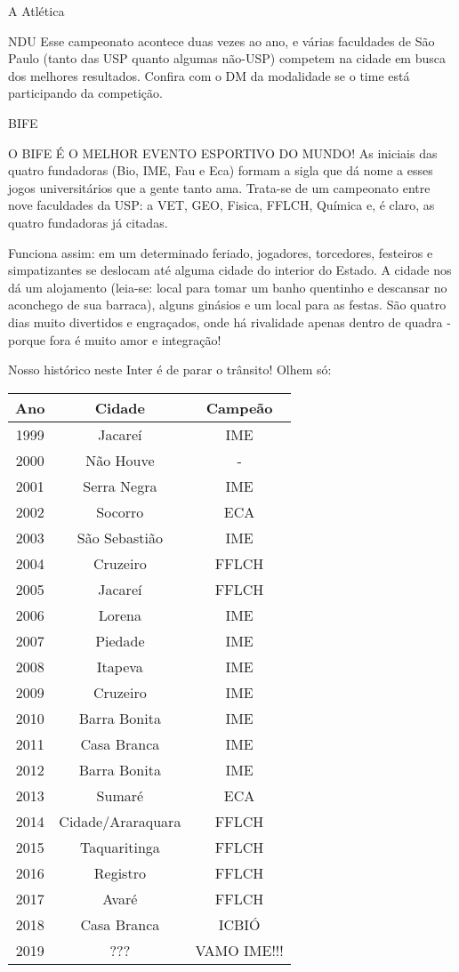 \begin{secao}{A Atlética}
\begin{subsecao}{NDU}
Esse campeonato acontece duas vezes ao ano, e várias faculdades de São Paulo
(tanto das USP quanto algumas não-USP) competem na cidade em busca dos melhores
resultados. Confira com o DM da modalidade se o time está participando da
competição.

\end{subsecao}
\begin{subsecao}{BIFE}

O BIFE É O MELHOR EVENTO ESPORTIVO DO MUNDO! As iniciais das quatro fundadoras
(Bio, IME, Fau e Eca) formam a sigla que dá nome a esses jogos universitários
que a gente tanto ama. Trata-se de um campeonato entre nove faculdades da USP:
a VET, GEO, Fisica, FFLCH, Química e, é claro, as quatro fundadoras já citadas.

Funciona assim: em um determinado feriado, jogadores, torcedores, festeiros e
simpatizantes se deslocam até alguma cidade do interior do Estado. A cidade nos
dá um alojamento (leia-se: local para tomar um banho quentinho e descansar no
aconchego de sua barraca), alguns ginásios e um local para as festas. São
quatro dias muito divertidos e engraçados, onde há rivalidade apenas dentro de
quadra - porque fora é muito amor e integração!

Nosso histórico neste Inter é de parar o trânsito! Olhem só:

\begin{center}
  \begin{tabular}{c|c|c}
   Ano & Cidade & Campeão\\
   \hline
   1999 & Jacareí & IME\\
   2000 & Não Houve & - \\
   2001 & Serra Negra & IME\\
   2002 & Socorro & ECA\\
   2003 & São Sebastião & IME\\
   2004 & Cruzeiro & FFLCH\\
   2005 & Jacareí & FFLCH\\
   2006 & Lorena & IME\\
   2007 & Piedade & IME\\
   2008 & Itapeva & IME\\
   2009 & Cruzeiro & IME\\
   2010 & Barra Bonita & IME\\
   2011 & Casa Branca & IME\\
   2012 & Barra Bonita & IME\\
   2013 & Sumaré & ECA\\
   2014 & Cidade/Araraquara & FFLCH\\
   2015 & Taquaritinga & FFLCH\\
   2016 & Registro & FFLCH\\
   2017 & Avaré & FFLCH\\
   2018 & Casa Branca & ICBIÓ\\
   2019 & ??? & VAMO IME!!!
  \end{tabular}
\end{center}


\end{subsecao}
\end{secao}
